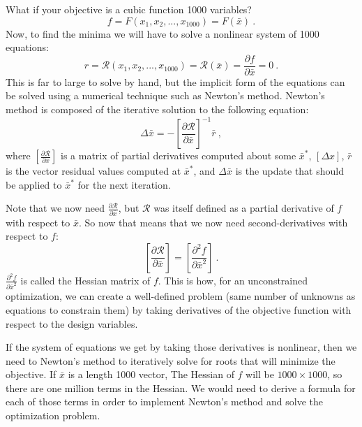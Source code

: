 \documentclass[conf]{new-aiaa}
\begin{document}
    What if your objective is a cubic function 1000 variables? 
    \begin{equation}
        f = F(x_1,x_2, ..., x_{1000}) = F(\bar{x}) \ . 
    \end{equation}
    Now, to find the minima we will have to solve a nonlinear system of 1000 equations: 
    \begin{equation} 
    r = \mathcal{R}(x_1, x_2, ...,  x_{1000}) =  \mathcal{R}(\bar{x}) = \frac{\partial f}{\partial \bar{x}} =  0 \ . 
    \end{equation}
    This is far to large to solve by hand, but the implicit form of the equations can be solved using a numerical technique such as Newton's method. 
    Newton's method is composed of the iterative solution to the following equation: 
    \begin{equation}
         \Delta \bar{x} = - \left[\frac{\partial \mathcal{R}}{\partial \bar{x}} \right]^{-1} \bar{r} \ , 
    \end{equation}
    where $\left[\frac{\partial \mathcal{R}}{\partial x} \right]$ is a matrix of partial derivatives computed about some $\bar{x}^*$, $\left[\Delta x\right]$, $\bar{r}$ is the vector residual values computed at $\bar{x}^*$, and $\Delta \bar{x}$ is the update that should be applied to $\bar{x}^*$ for the next iteration. 

    Note that we now need $\frac{\partial \mathcal{R}}{\partial \bar{x}}$, but $\mathcal{R}$ was itself defined as a partial derivative of $f$ with respect to $\bar{x}$. 
    So now that means that we now need second-derivatives with respect to $f$: 
    \begin{equation}
         \left[\frac{\partial \mathcal{R}}{\partial \bar{x}} \right] =  \left[\frac{\partial^2 f}{\partial \bar{x}^2} \right] \ . 
    \end{equation}
    $\frac{\partial^2 f}{\partial \bar{x}^2}$ is called the Hessian matrix of $f$.
    This is how, for an unconstrained optimization, we can create a well-defined problem (same number of unknowns as equations to constrain them) by taking derivatives of the objective function with respect to the design variables. 

    If the system of equations we get by taking those derivatives is nonlinear, then we need to Newton's method to iteratively solve for roots that will minimize the objective.  
    If $\bar{x}$ is a length 1000 vector, The Hessian of $f$ will be $1000 \times 1000$, 
    so there are one million terms in the Hessian. 
    We would need to derive a formula for each of those terms in order to implement Newton's method and solve the optimization problem. 
\end{document}
